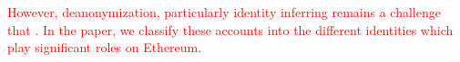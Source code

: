 \textcolor{red}{However, deanonymization, particularly identity inferring remains a challenge that . In the paper, we classify these accounts into the different identities which play significant roles on Ethereum.}


